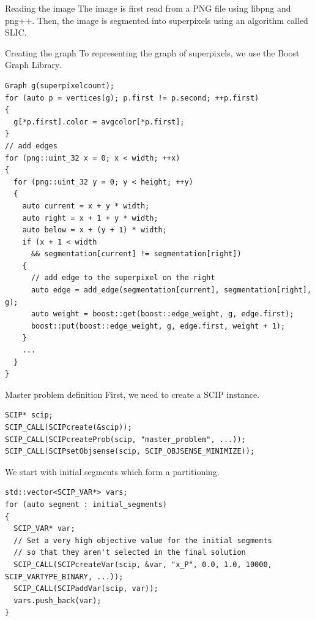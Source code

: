 \documentclass[fleqn]{beamer}
\begin{document}
    \begin{frame}{Reading the image}
        The image is first read from a PNG file using libpng and png++.
        Then, the image is segmented into superpixels using an algorithm called SLIC. %
    \end{frame}
    
    \begin{frame}[fragile]{Creating the graph}
        To representing the graph of superpixels, we use the Boost Graph Library.
        
		\begin{verbatim}
Graph g(superpixelcount);
for (auto p = vertices(g); p.first != p.second; ++p.first)
{
  g[*p.first].color = avgcolor[*p.first];
}	
// add edges
for (png::uint_32 x = 0; x < width; ++x)
{
  for (png::uint_32 y = 0; y < height; ++y)
  {
    auto current = x + y * width;
    auto right = x + 1 + y * width;
    auto below = x + (y + 1) * width;
    if (x + 1 < width
      && segmentation[current] != segmentation[right])
    {
      // add edge to the superpixel on the right
      auto edge = add_edge(segmentation[current], segmentation[right], g);
      auto weight = boost::get(boost::edge_weight, g, edge.first);
      boost::put(boost::edge_weight, g, edge.first, weight + 1);
    }
    ...
  }
}
		\end{verbatim}
	\end{frame}
	
	\begin{frame}[fragile]{Master problem definition}
        First, we need to create a SCIP instance.
        \begin{verbatim}
SCIP* scip;
SCIP_CALL(SCIPcreate(&scip));
SCIP_CALL(SCIPcreateProb(scip, "master_problem", ...));
SCIP_CALL(SCIPsetObjsense(scip, SCIP_OBJSENSE_MINIMIZE));
        \end{verbatim}
        
        We start with initial segments which form a partitioning.
        \begin{verbatim}
std::vector<SCIP_VAR*> vars;
for (auto segment : initial_segments)
{
  SCIP_VAR* var;
  // Set a very high objective value for the initial segments
  // so that they aren't selected in the final solution
  SCIP_CALL(SCIPcreateVar(scip, &var, "x_P", 0.0, 1.0, 10000, SCIP_VARTYPE_BINARY, ...));
  SCIP_CALL(SCIPaddVar(scip, var));
  vars.push_back(var);
}
        \end{verbatim}
    \end{frame}
\end{document}
